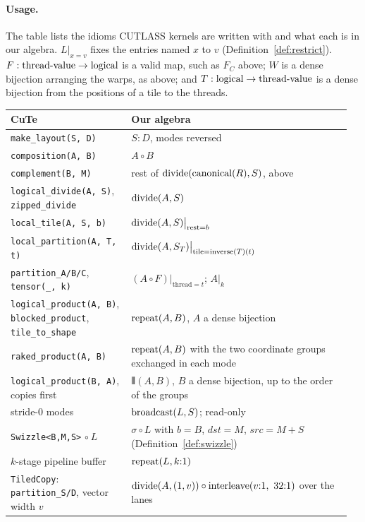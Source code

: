 \paragraph{Usage.} The table lists the idioms CUTLASS kernels are written
with and what each is in our algebra. $L|_{x = v}$ fixes the entries named
$x$ to $v$ (Definition~\ref{def:restrict}). $F : \textrm{thread-value} \to \textrm{logical}$ is a valid
map, such as $F_C$ above; $W$ is a dense bijection arranging the warps, as
above; and $T : \textrm{logical} \to \textrm{thread-value}$ is a dense bijection from the positions of
a tile to the threads.

\begin{center}\small
\begin{tabular}{@{}p{0.34\linewidth}p{0.62\linewidth}@{}}
\toprule
\textbf{CuTe} & \textbf{Our algebra} \\
\midrule
\texttt{make\_layout(S, D)} & $S{:}D$, modes reversed \\
\texttt{composition(A, B)} & $A \circ B$ \\
\texttt{complement(B, M)} & rest of $\mathrm{divide}(\mathrm{canonical}(R), S)$, above \\
\texttt{logical\_divide(A, S)}, \texttt{zipped\_divide} & $\mathrm{divide}(A, S)$ \\
\texttt{local\_tile(A, S, b)} & $\mathrm{divide}(A,S)\big|_{\mathrm{rest} = b}$ \\
\texttt{local\_partition(A, T, t)} & $\mathrm{divide}(A, S_T)\big|_{\mathrm{tile} = \mathrm{inverse}(T)(t)}$ \\
\texttt{partition\_A/B/C}, \texttt{tensor(\_, k)} & $(A \circ F)\big|_{\mathrm{thread} = t}$; $A\big|_{k}$ \\
\texttt{logical\_product(A, B)}, \texttt{blocked\_product}, \texttt{tile\_to\_shape} & $\mathrm{repeat}(A, B)$, $A$ a dense bijection \\
\texttt{raked\_product(A, B)} & $\mathrm{repeat}(A, B)$ with the two coordinate groups exchanged in each mode \\
\texttt{logical\_product(B, A)}, copies first & $\interleave(A, B)$, $B$ a dense bijection, up to the order of the groups \\
stride-$0$ modes & $\mathrm{broadcast}(L, S)$; read-only \\
\texttt{Swizzle<B,M,S>} $\circ\ L$ & $\sigma \circ L$ with $b = B$, $\mathit{dst} = M$, $\mathit{src} = M{+}S$ (Definition~\ref{def:swizzle}) \\
$k$-stage pipeline buffer & $\mathrm{repeat}(L, k{:}1)$ \\
\texttt{TiledCopy}: \texttt{partition\_S/D}, vector width $v$ & $\mathrm{divide}(A, (1,v)) \circ \mathrm{interleave}(v{:}1,\ 32{:}1)$ over the lanes \\

\end{tabular}
\end{center}
